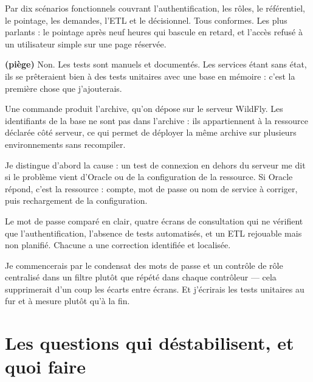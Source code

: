 \documentclass[a4paper,11pt]{article}
\begin{document}
Par dix scénarios fonctionnels couvrant l'authentification, les rôles, le
référentiel, le pointage, les demandes, l'ETL et le décisionnel. Tous conformes.
Les plus parlants : le pointage après neuf heures qui bascule en retard, et
l'accès refusé à un utilisateur simple sur une page réservée.

 \textbf{(piège)}
Non. Les tests sont manuels et documentés. Les services étant sans état, ils se
prêteraient bien à des tests unitaires avec une base en mémoire : c'est la
première chose que j'ajouterais.

Une commande produit l'archive, qu'on dépose sur le serveur WildFly. Les
identifiants de la base ne sont pas dans l'archive : ils appartiennent à la
ressource déclarée côté serveur, ce qui permet de déployer la même archive sur
plusieurs environnements sans recompiler.

Je distingue d'abord la cause : un test de connexion en dehors du serveur me dit
si le problème vient d'Oracle ou de la configuration de la ressource. Si Oracle
répond, c'est la ressource : compte, mot de passe ou nom de service à corriger,
puis rechargement de la configuration.

Le mot de passe comparé en clair, quatre écrans de consultation qui ne vérifient
que l'authentification, l'absence de tests automatisés, et un ETL rejouable mais
non planifié. Chacune a une correction identifiée et localisée.

Je commencerais par le condensat des mots de passe et un contrôle de rôle
centralisé dans un filtre plutôt que répété dans chaque contrôleur --- cela
supprimerait d'un coup les écarts entre écrans. Et j'écrirais les tests
unitaires au fur et à mesure plutôt qu'à la fin.

\newpage
\section{Les questions qui déstabilisent, et quoi faire}
\end{document}
